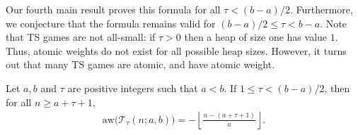 \documentclass[oneside,reqno]{amsart}
\newcommand{\ts}{\mathcal{T}}
\newcommand{\aw}{\mathrm{aw}}
\newcommand{\rp}{\mathscr{R}}
\newcommand{\hbeta}{\widehat\beta}
\begin{document}
Our fourth main result proves this formula for all $\tau<(b-a)/2$. Furthermore, we conjecture that the formula remains valid for $(b-a)/2\le\tau<b-a$. Note that {\sc TS} games are not all-small: if $\tau>0$ then a heap of size one has value $1$. Thus, atomic weights  do not exist for all possible heap sizes. However, it turns out that many {\sc TS} games are atomic, and have atomic weight. 




\begin{theorem}\label{thm: AW of TS}
    Let $a,b$ and $\tau$ are positive integers such that $a<b$. If $1\le \tau< (b-a)/2$, then for all $n\ge a+\tau+1$, 
    \begin{align}\label{eq:w}
    \aw\big(\ts_\tau(n;a,b)\big)=-\left\lfloor \frac{n-(a+\tau+1)}{a}\right\rfloor.
    \end{align}
\end{theorem}
\end{document}
